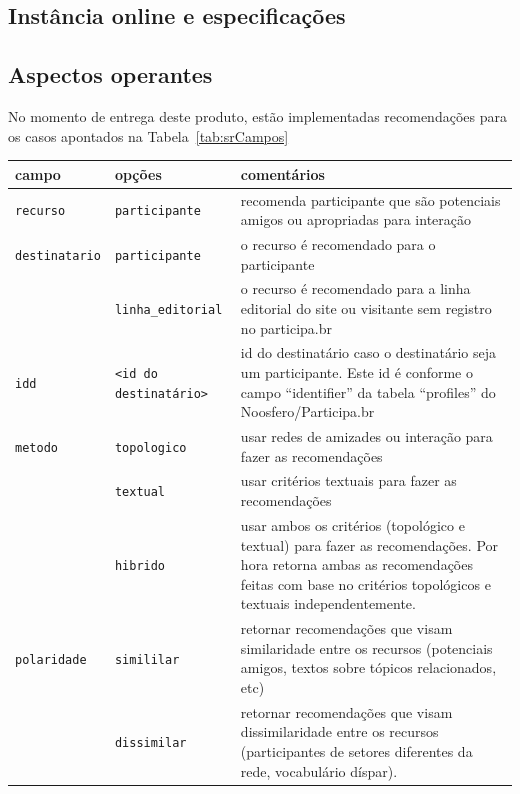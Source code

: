\documentclass[12pt]{article}
\begin{document}
\subsection{Instância online e especificações}
\subsection{Aspectos operantes}
No momento de entrega deste produto, estão implementadas recomendações para os casos apontados na Tabela~\ref{tab:srCampos}

\begin{table}
\begin{center}
\begin{tabular}{|l|l|p{10cm}|}\hline
\textbf{campo} & \textbf{opções} & \textbf{comentários} \\\hline\hline
\texttt{recurso}       & \texttt{participante} & recomenda participante que são potenciais amigos ou apropriadas para interação \\\hline
\texttt{destinatario}  & \texttt{participante} & o recurso é recomendado para o participante                  \\
                       & \texttt{linha\_editorial} & o recurso é recomendado para a linha editorial do site ou visitante sem registro no participa.br              \\\hline
\texttt{idd}           & \texttt{<id do destinatário>} & {\raggedright id do destinatário caso o destinatário seja um participante. Este id é conforme o campo ``identifier'' da tabela ``profiles'' do Noosfero/Participa.br}           \\\hline
\texttt{metodo}        & \texttt{topologico}  & usar redes de amizades ou interação para fazer as recomendações                   \\
                       & \texttt{textual}    &  usar critérios textuais para fazer as recomendações                   \\
                       & \texttt{hibrido}    &  {\raggedright usar ambos os critérios (topológico e textual) para fazer as recomendações. Por hora retorna ambas as recomendações feitas com base no critérios topológicos e textuais independentemente.} \\\hline
\texttt{polaridade}    & \texttt{simililar}  & retornar recomendações que visam similaridade entre os recursos (potenciais amigos, textos sobre tópicos relacionados, etc)                    \\
                       & \texttt{dissimilar}    & retornar recomendações que visam dissimilaridade entre os recursos (participantes de setores diferentes da rede, vocabulário díspar).                 \\

\end{tabular}
\end{center}
\end{table}
\end{document}

